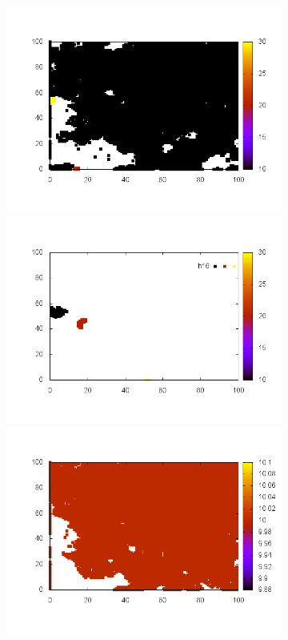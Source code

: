 \documentclass[10pt,a4paper]{article}
\begin{document}
\begin{figure}
\begin{subfigure}[b]{1\textwidth}
\includegraphics[scale=.3]{./img/SCC_Stable3/cut90p/15.png}
\includegraphics[scale=.3]{./img/SCC_Stable3/cut90p/16.png}
\includegraphics[scale=.3]{./img/SCC_Stable3/cut90p/17.png}
\end{subfigure}


\end{figure}
\end{document}
